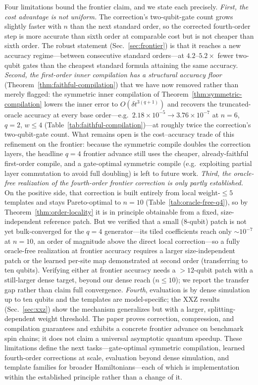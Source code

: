 \documentclass[aps,prxquantum,reprint,superscriptaddress,nofootinbib,amsmath,amssymb]{revtex4-2}
\newcommand{\dt}{\delta t}
\begin{document}
Four limitations bound the frontier claim, and we state each precisely. \emph{First, the cost advantage is not uniform.} The correction's two-qubit-gate count grows slightly faster with $n$ than the next standard order, so the corrected fourth-order step is more accurate than sixth order at comparable cost but is not cheaper than sixth order. The robust statement (Sec.~\ref{sec:frontier}) is that it reaches a new accuracy regime---between consecutive standard orders---at $4.2$--$5.2\times$ fewer two-qubit gates than the cheapest standard formula attaining the same accuracy. \emph{Second, the first-order inner compilation has a structural accuracy floor} (Theorem~\ref{thm:faithful-compilation}) that we have now removed rather than merely flagged: the symmetric inner compilation of Theorem~\ref{thm:symmetric-compilation} lowers the inner error to $O(\dt^{3(q+1)})$ and recovers the truncated-oracle accuracy at every base order---e.g.\ $2.18\times10^{-5}\!\to\!3.76\times10^{-7}$ at $n=6$, $q=2$, $w\le4$ (Table~\ref{tab:faithful-compilation})---at roughly twice the correction's two-qubit-gate count. What remains open is the cost--accuracy trade of this refinement on the frontier: because the symmetric compile doubles the correction layers, the headline $q=4$ frontier advance still uses the cheaper, already-faithful first-order compile, and a gate-optimal symmetric compile (e.g.\ exploiting partial layer commutation to avoid full doubling) is left to future work. \emph{Third, the oracle-free realization of the fourth-order frontier correction is only partly established.} On the positive side, that correction is built entirely from local weight-$\leq5$ templates and stays Pareto-optimal to $n=10$ (Table~\ref{tab:oracle-free-q4}), so by Theorem~\ref{thm:order-locality} it is in principle obtainable from a fixed, size-independent reference patch. But we verified that a small ($8$-qubit) patch is not yet bulk-converged for the $q=4$ generator---its tiled coefficients reach only $\sim10^{-7}$ at $n=10$, an order of magnitude above the direct local correction---so a fully oracle-free realization at frontier accuracy requires a larger size-independent patch or the learned per-site map demonstrated at second order (transferring to ten qubits). Verifying either at frontier accuracy needs a ${>}12$-qubit patch with a still-larger dense target, beyond our dense reach ($n\le10$); we report the transfer gap rather than claim full convergence. \emph{Fourth}, evaluation is by dense simulation up to ten qubits and the templates are model-specific; the XXZ results (Sec.~\ref{sec:xxz}) show the mechanism generalizes but with a larger, splitting-dependent weight threshold. The paper proves correction, compression, and compilation guarantees and exhibits a concrete frontier advance on benchmark spin chains; it does not claim a universal asymptotic quantum speedup. These limitations define the next tasks---gate-optimal symmetric compilation, learned fourth-order corrections at scale, evaluation beyond dense simulation, and template families for broader Hamiltonians---each of which is implementation within the established principle rather than a change of it.
\end{document}
